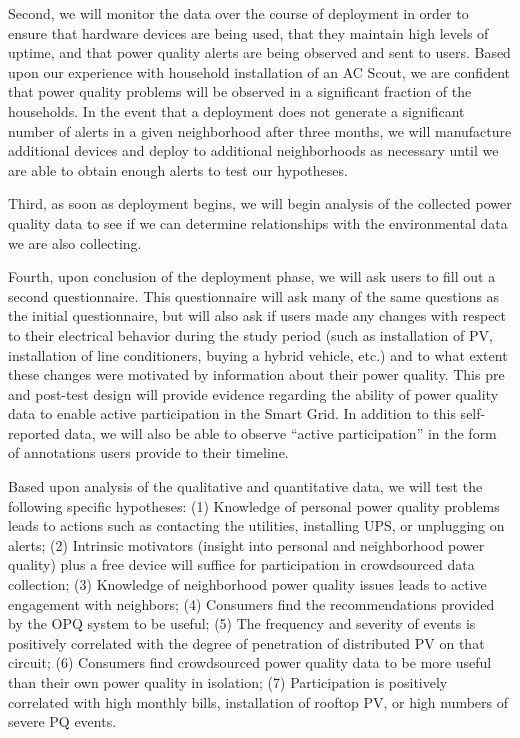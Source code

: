 Second, we will monitor the data over the course of deployment in order to ensure that hardware devices are being used, that they maintain high levels of uptime, and that power quality alerts are being observed and sent to users.  Based upon our experience with household installation of an AC Scout, we are confident that power quality problems will be observed in a significant fraction of the households.  In the event that a deployment does not generate a significant number of alerts in a given neighborhood after three months, we will manufacture additional devices and deploy to additional neighborhoods as necessary until we are able to obtain enough alerts to test our hypotheses.

Third, as soon as deployment begins, we will begin analysis of the collected power quality data to see if we can determine relationships with the environmental data we are also collecting. 

Fourth, upon conclusion of the deployment phase, we will ask users to fill out a second questionnaire.  This questionnaire will ask many of the same questions as the initial questionnaire, but will also ask if users made any changes with respect to their electrical behavior during the study period (such as installation of PV, installation of line conditioners, buying a hybrid vehicle, etc.) and to what extent these changes were motivated by information about their power quality.  This pre and post-test design will provide evidence regarding the ability of power quality data to enable active participation in the Smart Grid.  In addition to this self-reported data, we will also be able to observe ``active participation'' in the form of annotations users provide to their timeline.

Based upon analysis of the qualitative and quantitative data, we will test the following specific hypotheses: (1) Knowledge of personal power quality problems leads to actions such as contacting the utilities, installing UPS, or unplugging on alerts; (2) Intrinsic motivators (insight into personal and neighborhood power quality) plus a free device will suffice for participation in crowdsourced data collection; (3) Knowledge of neighborhood power quality issues leads to active engagement with neighbors; (4) Consumers find the recommendations provided by the OPQ system to be useful; (5) The frequency and severity of events is positively correlated with the degree of penetration of distributed PV on that circuit; (6) Consumers find crowdsourced power quality data to be more useful than their own power quality in isolation; (7) Participation is positively correlated with high monthly bills, installation of rooftop PV, or high numbers of severe PQ events.
















